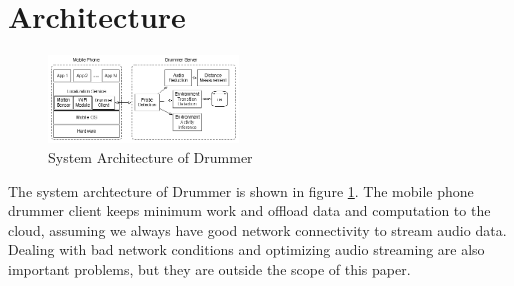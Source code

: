 \section{Architecture}
\label{sec:arch}


\begin{figure}[H]
\centering
\includegraphics[width=0.45\textwidth]{./fig/arch.eps}
\caption{System Architecture of Drummer}
\label{fig:arch}
\end{figure}

The system archtecture of Drummer is shown in figure \ref{fig:arch}. The mobile phone drummer 
client keeps minimum work and offload data and computation to the cloud, assuming we always
have good network connectivity to stream audio data. Dealing with bad network conditions 
\cite{cuervo2010maui} and optimizing audio streaming \cite{farleycsense} are also important 
problems, but they are outside the scope of this paper. 





